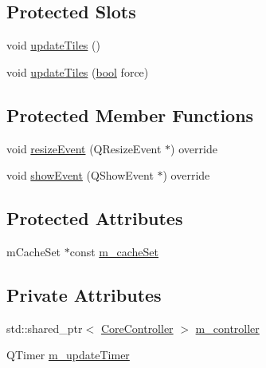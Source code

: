 \subsection*{Protected Slots}
\begin{DoxyCompactItemize}
\item 
void \mbox{\hyperlink{class_q_g_b_a_1_1_asset_view_a193af696b5d01a5a382c0b9410d5b708}{update\+Tiles}} ()
\item 
void \mbox{\hyperlink{class_q_g_b_a_1_1_asset_view_a9ef6a03dbe512bec5dbd2aa5baa57f73}{update\+Tiles}} (\mbox{\hyperlink{libretro_8h_a4a26dcae73fb7e1528214a068aca317e}{bool}} force)
\end{DoxyCompactItemize}
\subsection*{Protected Member Functions}
\begin{DoxyCompactItemize}
\item 
void \mbox{\hyperlink{class_q_g_b_a_1_1_asset_view_ac4b7532fd5b92a097f5930df993ef215}{resize\+Event}} (Q\+Resize\+Event $\ast$) override
\item 
void \mbox{\hyperlink{class_q_g_b_a_1_1_asset_view_a56855e2ceca48f1940a5db614819d509}{show\+Event}} (Q\+Show\+Event $\ast$) override
\end{DoxyCompactItemize}
\subsection*{Protected Attributes}
\begin{DoxyCompactItemize}
\item 
m\+Cache\+Set $\ast$const \mbox{\hyperlink{class_q_g_b_a_1_1_asset_view_af4c3bc555866c27babd5d3fd7eed3f45}{m\+\_\+cache\+Set}}
\end{DoxyCompactItemize}
\subsection*{Private Attributes}
\begin{DoxyCompactItemize}
\item 
std\+::shared\+\_\+ptr$<$ \mbox{\hyperlink{class_q_g_b_a_1_1_core_controller}{Core\+Controller}} $>$ \mbox{\hyperlink{class_q_g_b_a_1_1_asset_view_a83056c8c594d800c39aa0ba571a2603a}{m\+\_\+controller}}
\item 
Q\+Timer \mbox{\hyperlink{class_q_g_b_a_1_1_asset_view_a7061a8321755debdc41f68bf7a070897}{m\+\_\+update\+Timer}}
\end{DoxyCompactItemize}


